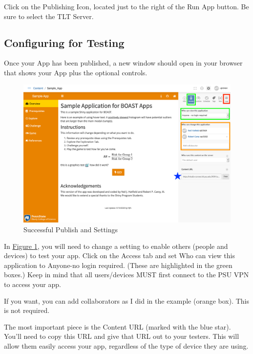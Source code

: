 \documentclass[
]{book}
\begin{document}
Click on the Publishing Icon, located just to the right of the Run App button. Be sure to select the TLT Server.

\hypertarget{configuring-for-testing}{%
\subsection{Configuring for Testing}\label{configuring-for-testing}}

Once your App has been published, a new window should open in your browser that shows your App plus the optional controls.

\begin{figure}

{\centering \includegraphics[width=18.67in]{images/publish3} 

}

\caption{Successful Publish and Settings}\label{fig:testing3}
\end{figure}

In \protect\hyperlink{fig:testing3}{Figure \ref{fig:testing3}}, you will need to change a setting to enable others (people and devices) to test your app. Click on the Access tab and set Who can view this application to Anyone-no login required. (These are highlighted in the green boxes.) Keep in mind that all users/devices MUST first connect to the PSU VPN to access your app.

If you want, you can add collaborators as I did in the example (orange box). This is not required.

The most important piece is the Content URL (marked with the blue star). You'll need to copy this URL and give that URL out to your testers. This will allow them easily access your app, regardless of the type of device they are using.
\end{document}
